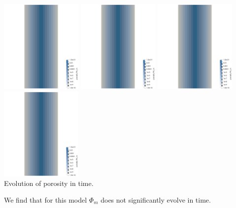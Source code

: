 \begin{center}
\includegraphics[width=4cm]{python_codes/fieldstone_126/results/model1/nelx32/phi_0.png}
\includegraphics[width=4cm]{python_codes/fieldstone_126/results/model1/nelx32/phi_1.png}
\includegraphics[width=4cm]{python_codes/fieldstone_126/results/model1/nelx32/phi_2.png}
\includegraphics[width=4cm]{python_codes/fieldstone_126/results/model1/nelx32/phi_3.png}\\
{\captionfont Evolution of porosity in time.}
\end{center}

We find that for this model $\Phi_m$ does not significantly evolve in time.



